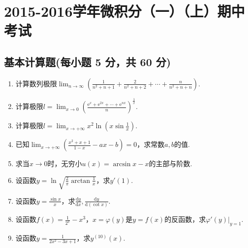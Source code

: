 \documentclass[../Main.tex]{subfiles}
\begin{document}
\chapter{2015-2016学年微积分（一）（上）期中考试}

\section{基本计算题(每小题 5 分，共 60 分)}
\begin{enumerate}
    \item 计算数列极限$\lim_{n\to\infty}\left(\frac{1}{n^{2}+n+1}+\frac{2}{n^{2}+n+2}
              +\cdots+\frac{n}{n^{2}+n+n}\right)$.
          \vspace{7em}

    \item 计算极限$l=\lim_{x\to 0}\left(\frac{\mathrm{e}^{x}+\mathrm{e}^{2x}+\cdots+\mathrm{e}^{nx}}{n}
              \right)^{\frac{1}{x}}$.
          \vspace{7em}

    \item 计算极限$l=\lim_{x\to +\infty}x^{2}\ln\left(x\sin\frac{1}{x}\right)$.
          \vspace{7em}

    \item 已知$\lim_{x\to+\infty}\left(\frac{x^{2}+x+1}{1-x}-ax-b\right)=0$，求常数$a
              ,b$的值.
          \vspace{8em}

    \item 求当$x\to0$时，无穷小$u(x)=\arcsin x-x$的主部与阶数.
          \vspace{8em}

    \item 设函数$y=\ln\sqrt{\frac{2}{\pi}\arctan\frac{1}{x}}$，求$y'(1)$.
          \vspace{8em}

    \item 设函数$y=\frac{\sin x}{x}$，求$\frac{\mathrm{d}y}{\mathrm{d}x},\frac{\mathrm{d}y}{\mathrm{d}(\cot
                  x)}$.
          \vspace{7em}

    \item 设函数$f(x)=\frac{1}{2^{x}}-x^{3}$，$x=\varphi(y)$是$y=f(x)$的反函数，求$\left
              .\varphi'(y)\right|_{y=1}$.
          \vspace{7em}

    \item 设函数$y=\frac{1}{2x^{2}-3x+1}$，求$y^{(10)}(x)$.
          \vspace{8em}


\end{enumerate}
\end{document}
